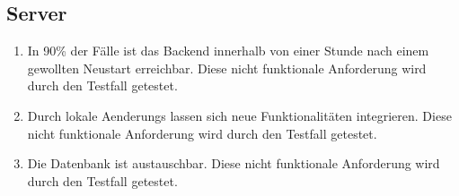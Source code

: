 \subsection*{Server}

\begin{samepage}
    \begin{enumerate}[label=\textbf{/NFW\arabic*0/}, align=left, start=5]
        \item \label{/NFW50/} In 90\% der Fälle ist das \Gls{Backend} innerhalb von einer Stunde nach einem gewollten Neustart erreichbar. Diese nicht funktionale Anforderung wird durch den Testfall  getestet.
        \item \label{/NFW60/} Durch \glspl{lokale Aenderung} lassen sich neue Funktionalitäten integrieren. Diese nicht funktionale Anforderung wird durch den Testfall  getestet.
        \item \label{/NFW70/} Die \Gls{Datenbank} ist austauschbar. Diese nicht funktionale Anforderung wird durch den Testfall  getestet.
    \end{enumerate}
\end{samepage}